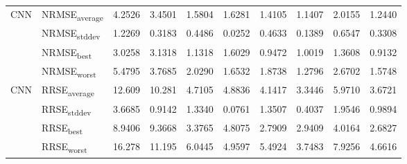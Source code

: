 {\begin{longtable}{l l c c c c c c c c}
\cmidrule(lr){2-10}
\multirow{4}{*}{CNN} & NRMSE\textsubscript{average} & 4.2526 & 3.4501 & 1.5804 & 1.6281 & 1.4105 & 1.1407 & 2.0155 & 1.2440 \\
 & NRMSE\textsubscript{stddev} & 1.2269 & 0.3183 & 0.4486 & 0.0252 & 0.4633 & 0.1389 & 0.6547 & 0.3308 \\
 & NRMSE\textsubscript{best} & 3.0258 & 3.1318 & 1.1318 & 1.6029 & 0.9472 & 1.0019 & 1.3608 & 0.9132 \\
 & NRMSE\textsubscript{worst} & 5.4795 & 3.7685 & 2.0290 & 1.6532 & 1.8738 & 1.2796 & 2.6702 & 1.5748 \\
\cmidrule(lr){2-10}
\multirow{4}{*}{CNN} & RRSE\textsubscript{average} & 12.609 & 10.281 & 4.7105 & 4.8836 & 4.1417 & 3.3446 & 5.9710 & 3.6721 \\
 & RRSE\textsubscript{stddev} & 3.6685 & 0.9142 & 1.3340 & 0.0761 & 1.3507 & 0.4037 & 1.9546 & 0.9894 \\
 & RRSE\textsubscript{best} & 8.9406 & 9.3668 & 3.3765 & 4.8075 & 2.7909 & 2.9409 & 4.0164 & 2.6827 \\
 & RRSE\textsubscript{worst} & 16.278 & 11.195 & 6.0445 & 4.9597 & 5.4924 & 3.7483 & 7.9256 & 4.6616 \\
\cmidrule(lr){2-10}
\end{longtable}
}